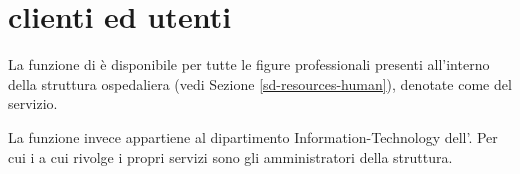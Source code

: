 %
%
\section[Clienti ed utenti]{clienti ed utenti}
\label{sd-client-users}
La funzione di  è disponibile per tutte le figure professionali presenti all'interno della struttura ospedaliera (vedi Sezione \ref{sd-resources-human}), denotate come  del servizio.

La funzione invece appartiene al dipartimento \acs{Information-Technology} dell'\entity{}. Per cui i  a cui rivolge i propri servizi sono gli amministratori della struttura.